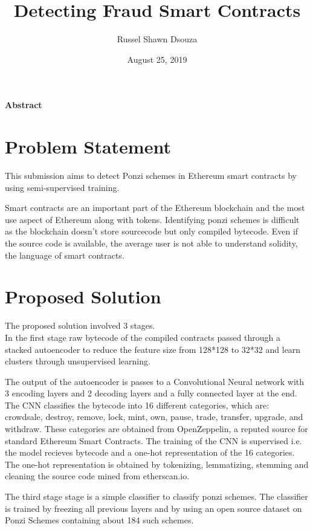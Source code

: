 \documentclass[11pt]{article}
\title{\textbf{Detecting Fraud Smart Contracts}}
\author{Russel Shawn Dsouza}
\date{August 25, 2019}
\theoremstyle{definition}
\begin{document}
  \maketitle

  \begin{center}
    \textbf{Abstract}
  \end{center}

  \section{Problem Statement}
   This submission aims to detect Ponzi schemes in Ethereum smart contracts by using semi-supervised training.

   Smart contracts are an important part of the Ethereum blockchain and the most use aspect of Ethereum along with tokens. Identifying ponzi schemes is difficult as the blockchain doesn't store sourcecode but only compiled bytecode. Even if the source code is available, the average user is not able to understand solidity, the language of smart contracts.

  \section{Proposed Solution}
    The proposed solution involved 3 stages.\\
    In the first stage raw bytecode of the compiled contracts passed through a stacked autoencoder to reduce the feature size from 128*128 to 32*32 and learn clusters through unsupervised learning.

    The output of the autoencoder is passes to a Convolutional Neural network with 3 encoding layers and 2 decoding layers and a fully connected layer at the end.
    The CNN classifies the bytecode into 16 different categories, which are: crowdsale, destroy, remove, lock, mint, own, pause, trade, transfer, upgrade, and withdraw. These categories are obtained from OpenZeppelin, a reputed source for standard Ethereum Smart Contracts.
    The training of the CNN is supervised i.e. the model recieves bytecode and a one-hot representation of the 16 categories.
    The one-hot representation is obtained by tokenizing, lemmatizing, stemming and cleaning the source code mined from etherscan.io.

    The third stage stage is a simple classifier to classify ponzi schemes.
    The classifier is trained by freezing all previous layers and by using an open source dataset on Ponzi Schemes containing about 184 such schemes.
\end{document}
